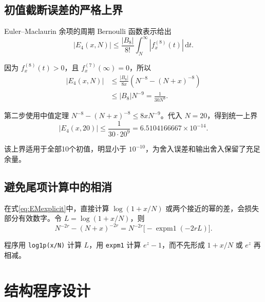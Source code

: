 \documentclass[UTF8,fontset=fandol,zihao=-4,a4paper]{ctexart}
\newcommand{\dd}{\mathrm{d}}
\begin{document}
\subsection{初值截断误差的严格上界}
Euler--Maclaurin 余项的周期 Bernoulli 函数表示给出
\[
 |E_4(x,N)|\le\frac{|B_8|}{8!}
 \int_N^{\infty}|f_x^{(8)}(t)|\,\dd t.
\]

因为 $f_x^{(8)}(t)>0$，且 $f_x^{(7)}(\infty)=0$，所以
\begin{align*}
 |E_4(x,N)|
 &\le \frac{|B_8|}{8x}\left(N^{-8}-(N+x)^{-8}\right)\\
 &\le |B_8|N^{-9}=\frac{1}{30N^9}.
\end{align*}

第二步使用中值定理 $N^{-8}-(N+x)^{-8}\le8xN^{-9}$。代入 $N=20$，得到统一上界
\begin{equation}\label{eq:bound}
 \boxed{|E_4(x,20)|\le\frac1{30\cdot20^9}
 =6.5104166667\times10^{-14}.}
\end{equation}

该上界适用于全部10个初值，明显小于 $10^{-10}$，为舍入误差和输出舍入保留了充足余量。

\subsection{避免尾项计算中的相消}
在式\eqref{eq:EMexplicit}中，直接计算 $\log(1+x/N)$ 或两个接近的幂的差，会损失部分有效数字。令 $L=\log(1+x/N)$，则
\begin{equation}
 N^{-2r}-(N+x)^{-2r}
 =N^{-2r}\bigl[-\operatorname{expm1}(-2rL)\bigr].
\end{equation}

程序用 \texttt{log1p(x/N)} 计算 $L$，用 \texttt{expm1} 计算 $e^z-1$，而不先形成 $1+x/N$ 或 $e^z$ 再相减。


\section{结构程序设计}
\end{document}
